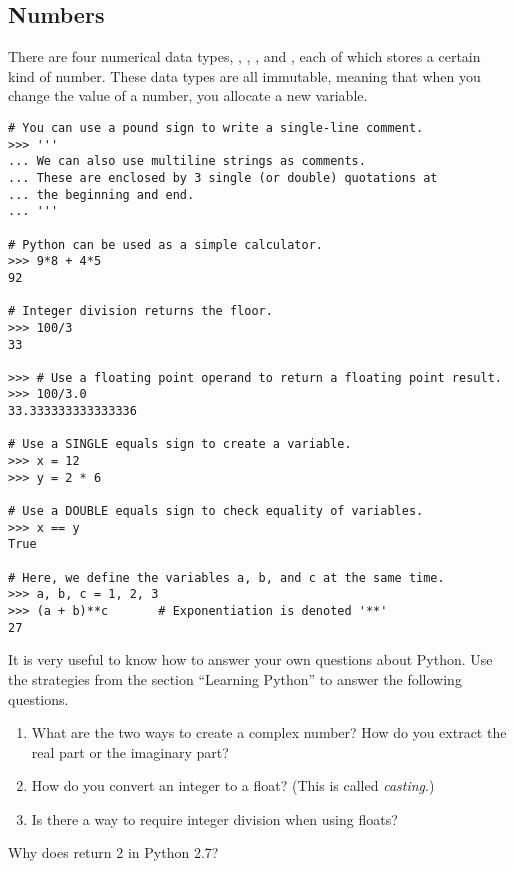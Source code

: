 \subsection*{Numbers}
There are four numerical data types, , , 
, and , each of which stores a certain kind of number. These data types are all immutable, meaning that when you change the value of a number, you allocate a new variable.

\begin{lstlisting}
# You can use a pound sign to write a single-line comment.
>>> '''
... We can also use multiline strings as comments. 
... These are enclosed by 3 single (or double) quotations at 
... the beginning and end. 
... '''

# Python can be used as a simple calculator.
>>> 9*8 + 4*5
92

# Integer division returns the floor.
>>> 100/3
33

>>> # Use a floating point operand to return a floating point result.
>>> 100/3.0
33.333333333333336

# Use a SINGLE equals sign to create a variable.
>>> x = 12
>>> y = 2 * 6

# Use a DOUBLE equals sign to check equality of variables.
>>> x == y
True

# Here, we define the variables a, b, and c at the same time.
>>> a, b, c = 1, 2, 3
>>> (a + b)**c       # Exponentiation is denoted '**'
27
\end{lstlisting}


\begin{problem}
It is very useful to know how to answer your own questions about Python. Use the strategies from the section ``Learning Python'' to answer the following questions.
\begin{enumerate}

\item What are the two ways to create a complex number? 
How do you extract the real part or the imaginary part?
\item How do you convert an integer to a float? (This is called \emph{casting}.)
\item Is there a way to require integer division when using floats?
\end{enumerate}
\end{problem}

\begin{problem}
Why does  return 2 in Python 2.7? 
\end{problem}

